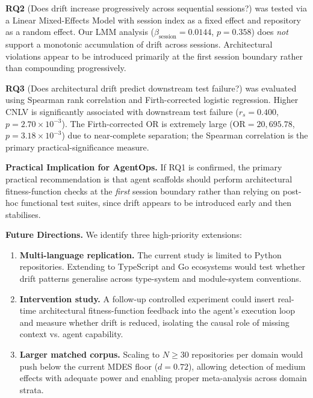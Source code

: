 \documentclass[11pt]{article}
\begin{document}
\textbf{RQ2} (Does drift increase progressively across sequential
sessions?) was tested via a Linear Mixed-Effects Model with session
index as a fixed effect and repository as a random effect.
Our LMM analysis ($\beta_{\text{session}} = 0.0144$,
$p = 0.358$) does \emph{not} support a
monotonic accumulation of drift across sessions. Architectural
violations appear to be introduced primarily at the first session
boundary rather than compounding progressively.

\textbf{RQ3} (Does architectural drift predict downstream test failure?)
was evaluated using Spearman rank correlation and Firth-corrected
logistic regression. Higher CNLV is significantly associated with
downstream test failure ($r_s = 0.400$, $p = 2.70 \times 10^{-3}$).
The Firth-corrected OR is extremely large ($\mathrm{OR} = 20{,}695.78$,
$p = 3.18 \times 10^{-3}$) due to near-complete separation;
the Spearman correlation is the primary practical-significance measure.

\textbf{Practical Implication for AgentOps.}
If RQ1 is confirmed, the primary practical recommendation is that
agent scaffolds should perform architectural fitness-function checks
at the \emph{first} session boundary rather than relying on post-hoc
functional test suites, since drift appears to be introduced early
and then stabilises.

\textbf{Future Directions.}
We identify three high-priority extensions:
\begin{enumerate}
    \item \textbf{Multi-language replication.} The current study is
    limited to Python repositories. Extending to TypeScript and Go
    ecosystems would test whether drift patterns generalise across
    type-system and module-system conventions.
    \item \textbf{Intervention study.} A follow-up controlled experiment
    could insert real-time architectural fitness-function feedback into
    the agent's execution loop and measure whether drift is reduced,
    isolating the causal role of missing context vs. agent capability.
    \item \textbf{Larger matched corpus.} Scaling to $N \ge 30$
    repositories per domain would push below the current MDES floor
    ($d = 0.72$), allowing detection of medium effects with adequate
    power and enabling proper meta-analysis across domain strata.
\end{enumerate}

\end{document}
